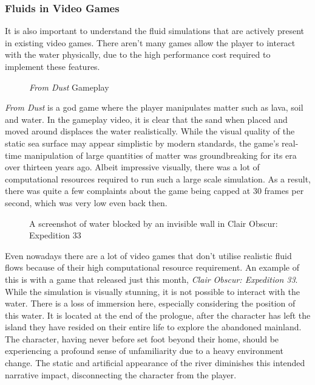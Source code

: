 \documentclass[12pt]{article}
\newcommand{\wideimage}[2][]{%
  \makebox[\textwidth][c]{\texttt{[image: \#2]}}%
}
\begin{document}
    \subsubsection{Fluids in Video Games}

    It is also important to understand the fluid simulations that are actively present in existing video games. There aren't many games allow the player to interact with the water physically, due to the high performance cost required to implement these features.

    \begin{figure}[H]
        \wideimage[]{fromDust.png}
        \caption{\textit{From Dust} Gameplay \cite{fromdustvideo}}
    \end{figure}

    \textit{From Dust}\cite{fromdust} is a god game where the player manipulates matter such as lava, soil and water. In the gameplay video\cite{fromdustvideo}, it is clear that the sand when placed and moved around displaces the water realistically. While the visual quality of the static sea surface may appear simplistic by modern standards, the game's real-time manipulation of large quantities of matter was groundbreaking for its era over thirteen years ago. Albeit impressive visually, there was a lot of computational resources required to run such a large scale simulation. As a result, there was quite a few complaints about the game being capped at 30 frames per second\cite{dsog}, which was very low even back then.
    
    \begin{figure}[H]
        \wideimage[]{clairObscur.png}
        \caption{A screenshot of water blocked by an invisible wall in Clair Obscur: Expedition 33}
    \end{figure}

    Even nowadays there are a lot of video games that don't utilise realistic fluid flows because of their high computational resource requirement. An example of this is with a game that released just this month, \textit{Clair Obscur: Expedition 33}\cite{clairobscur}.
    While the simulation is visually stunning, it is not possible to interact with the water. There is a loss of immersion here, especially considering the position of this water. It is located at the end of the prologue, after the character has left the island they have resided on their entire life to explore the abandoned mainland. The character, having never before set foot beyond their home, should be experiencing a profound sense of unfamiliarity due to a heavy environment change. The static and artificial appearance of the river diminishes this intended narrative impact, disconnecting the character from the player.
\end{document}
